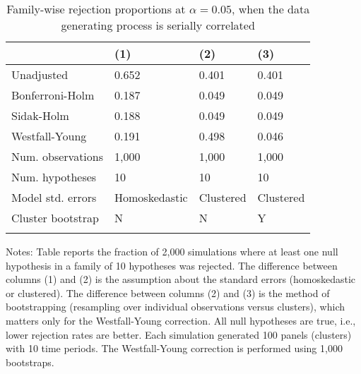 \documentclass{article}
\begin{document}
\begin{table}[tbp] \centering
{}

\caption{Family-wise rejection proportions at \(\alpha = 0.05\), when the data generating process is serially correlated}
\label{tab:wyoung2}
\begin{tabularx}{\textwidth}{lCCC}

\toprule
&{(1)}&{(2)}&{(3)} \tabularnewline
\midrule\addlinespace[1.5ex]
Unadjusted&0.652&0.401&0.401 \tabularnewline
Bonferroni-Holm&0.187&0.049&0.049 \tabularnewline
Sidak-Holm&0.188&0.049&0.049 \tabularnewline
Westfall-Young&0.191&0.498&0.046 \tabularnewline
\midrule Num. observations&1,000&1,000&1,000 \tabularnewline
Num. hypotheses&10&10&10 \tabularnewline
Model std. errors&Homoskedastic&Clustered&Clustered \tabularnewline
Cluster bootstrap&N&N&Y \tabularnewline
\bottomrule \addlinespace[1.5ex]

\end{tabularx}
\begin{flushleft}
\footnotesize Notes: Table reports the fraction of 2,000 simulations where at least one null hypothesis in a family of 10 hypotheses was rejected. The difference between columns (1) and (2) is the assumption about the standard errors (homoskedastic or clustered). The difference between columns (2) and (3) is the method of bootstrapping (resampling over individual observations versus clusters), which matters only for the Westfall-Young correction. All null hypotheses are true, i.e., lower rejection rates are better. Each simulation generated 100 panels (clusters) with 10 time periods. The Westfall-Young correction is performed using 1,000 bootstraps.
\end{flushleft}
\end{table}
\end{document}
